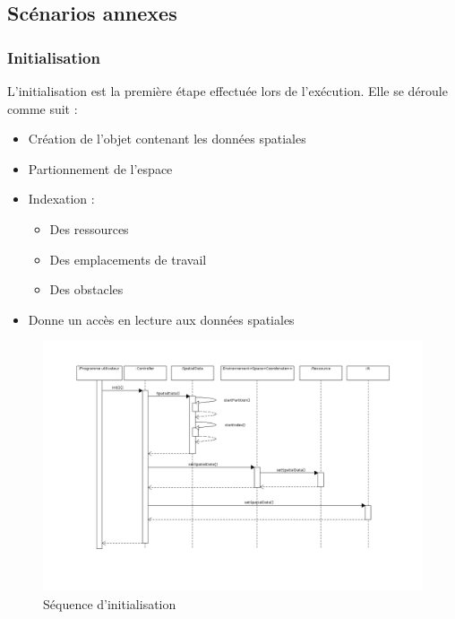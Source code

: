 \newpage
\subsection{Scénarios annexes}

\subsubsection{Initialisation}

L'initialisation est la première étape effectuée lors de l'exécution. Elle se déroule comme suit :\\

	\begin{itemize}
	\setlength{\itemsep}{5pt}
	\item Création de l'objet contenant les données spatiales
	\item Partionnement de l'espace
	\item Indexation : %
		\begin{itemize}
		\item Des ressources
		\item Des emplacements de travail
		\item Des obstacles
		\end{itemize}
    \item Donne un accès en lecture aux données spatiales\\
	\end{itemize}

\begin{figure}[!p]\centering
   \includegraphics[angle=90, scale=0.5]{images/seq_init.png}
   \caption{\label{seq_init} Séquence d'initialisation}
\end{figure}

